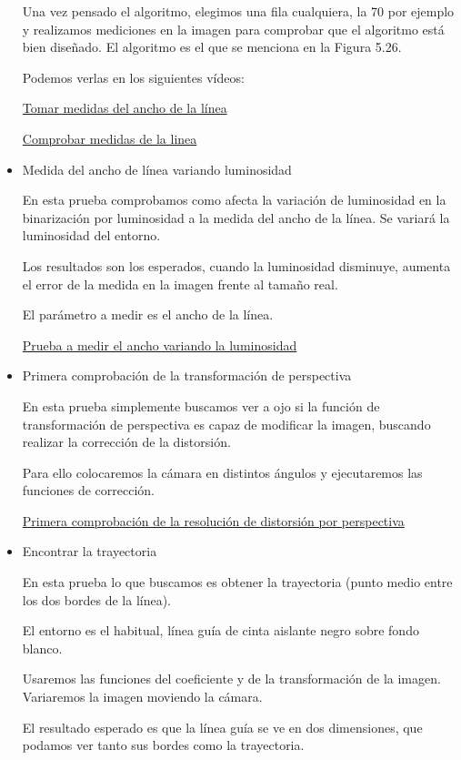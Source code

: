 \begin{itemize}
Una vez pensado el algoritmo, elegimos una fila cualquiera, la 70 por ejemplo y realizamos mediciones en la imagen para comprobar que el algoritmo está bien diseñado. El algoritmo es el que se menciona en la Figura 5.26.

	
	Podemos verlas en los siguientes vídeos:
	
	\href{https://youtu.be/rUQrHbA_H8A}{Tomar medidas del ancho de la línea}
	
	\href{https://youtu.be/ClA-Ei8f18o}{Comprobar medidas de la linea}
	
	\item Medida del ancho de línea variando luminosidad
	
	En esta prueba comprobamos como afecta la variación de luminosidad en la binarización por luminosidad a la medida del ancho de la línea.
Se variará la luminosidad del entorno.

Los resultados son los esperados, cuando la luminosidad disminuye, aumenta el error de la medida en la imagen frente al tamaño real.

El parámetro a medir es el ancho de la línea.
	
	\href{https://youtu.be/m7t4dcfuFeo}{Prueba a medir el ancho variando la luminosidad}
	
	\item Primera comprobación de la transformación de perspectiva
	
	En esta prueba simplemente buscamos ver a ojo si la función de transformación de perspectiva es capaz de modificar la imagen, buscando realizar la corrección de la distorsión.
	
Para ello colocaremos la cámara en distintos ángulos y ejecutaremos las funciones de corrección.
	
	\href{https://youtu.be/pRE8zerfp7E}{Primera comprobación de la resolución de distorsión por perspectiva}
	
	\item Encontrar la trayectoria
	
	En esta prueba lo que buscamos es obtener la trayectoria (punto medio entre los dos bordes de la línea).
	
El entorno es el habitual, línea guía de cinta aislante negro sobre fondo blanco.

Usaremos las funciones del coeficiente y de la transformación de la imagen. Variaremos la imagen moviendo la cámara.

El resultado esperado es que la línea guía se ve en dos dimensiones, que podamos ver tanto sus bordes como la trayectoria.


\end{itemize}
